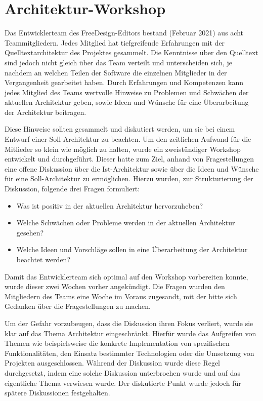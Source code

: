\section{Architektur-Workshop}
Das Entwicklerteam des FreeDesign-Editors bestand (Februar 2021) aus acht Teammitgliedern. Jedes Mitglied hat tiefgreifende Erfahrungen mit der Quelltextarchitektur des Projektes gesammelt. 
Die Kenntnisse über den Quelltext sind jedoch nicht gleich über das Team verteilt und unterscheiden sich, je nachdem an welchen Teilen der Software die einzelnen Mitglieder in der Vergangenheit gearbeitet haben.
Durch Erfahrungen und Kompetenzen kann jedes Mitglied des Teams wertvolle Hinweise zu Problemen und Schwächen der aktuellen Architektur geben, sowie Ideen und Wünsche für eine Überarbeitung der Architektur beitragen.

Diese Hinweise sollten gesammelt und diskutiert werden, um sie bei einem Entwurf einer Soll-Architektur zu beachten. Um den zeitlichen Aufwand für die Mitlieder so klein wie möglich zu halten, wurde ein zweistündiger Workshop entwickelt und durchgeführt. Dieser hatte zum Ziel, anhand von Fragestellungen eine offene Diskussion über die Ist-Architektur sowie über die Ideen und Wünsche für eine Soll-Architektur zu ermöglichen. 
Hierzu wurden, zur Strukturierung der Diskussion, folgende drei Fragen formuliert: 
\begin{itemize}
	\item Was ist positiv in der aktuellen Architektur hervorzuheben?
	\item Welche Schwächen oder Probleme werden in der aktuellen Architektur gesehen?
	\item Welche Ideen und Vorschläge sollen in eine Überarbeitung der Architektur beachtet werden?
\end{itemize}
Damit das Entwicklerteam sich optimal auf den Workshop vorbereiten konnte, wurde dieser zwei Wochen vorher angekündigt. Die Fragen wurden den Mitgliedern des Teams eine Woche im Voraus zugesandt, mit der bitte sich Gedanken über die Fragestellungen zu machen.  

Um der Gefahr vorzubeugen, dass die Diskussion ihren Fokus verliert, wurde sie klar auf das Thema Architektur eingeschränkt.
Hierfür wurde das Aufgreifen von Themen wie beispielsweise die konkrete Implementation von spezifischen Funktionalitäten, den Einsatz bestimmter Technologien oder die Umsetzung von Projekten ausgeschlossen. Während der Diskussion wurde diese Regel durchgesetzt, indem eine solche Diskussion unterbrochen wurde und auf das eigentliche Thema verwiesen wurde. Der diskutierte Punkt wurde jedoch für spätere Diskussionen festgehalten.
